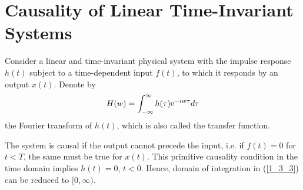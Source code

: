\documentclass[journal,twoside]{IEEEtran}
\begin{document}
\section{Causality of Linear Time-Invariant Systems} \label{causality}

Consider a linear and time-invariant physical system with the impulse response  ${ h}(t)$ 
subject to a time-dependent input ${ f(t)}$, to which it responds by an output ${ x(t)}$. 
Denote by 
\begin{equation} \label{1_3_3}
{ H}(w)=\int_{-\infty}^\infty { h}(\tau){\mathop{\rm e}\nolimits}^{-i w\tau}d\tau
\end{equation}
the Fourier transform of ${ h(t)}$, which is also called the transfer function.  

The system is causal if  the output cannot precede the input, i.e. if ${ f
}(t)=0$  for $t<T$, the same must be true for ${ x(t)}$. This primitive causality condition in the time domain  implies ${ h}(t)=0$,  $t<0$. Hence, domain of integration in (\ref{1_3_3}) can be reduced to $[0,\infty)$.
\end{document}
